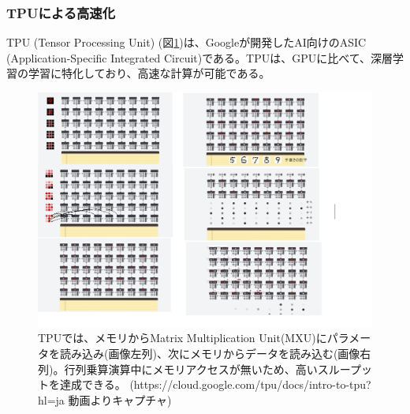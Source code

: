 \documentclass{ltjsarticle}
\begin{document}
\subsubsection{TPUによる高速化}
TPU (Tensor Processing Unit) (図\ref{fig:TPU})は、Googleが開発したAI向けのASIC (Application-Specific Integrated Circuit)である。TPUは、GPUに比べて、深層学習の学習に特化しており、高速な計算が可能である。
\begin{figure}[htbp]
  \centering
  \includegraphics[width=15cm]{./capture/TPU.png}
  \caption{TPUでは、メモリからMatrix Multiplication Unit(MXU)にパラメータを読み込み(画像左列)、次にメモリからデータを読み込む(画像右列)。行列乗算演算中にメモリアクセスが無いため、高いスループットを達成できる。 (https://cloud.google.com/tpu/docs/intro-to-tpu?hl=ja 動画よりキャプチャ)}
  \label{fig:TPU}
\end{figure}
\end{document}

